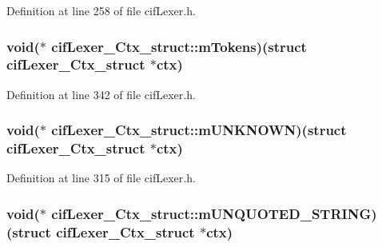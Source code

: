 Definition at line 258 of file cif\-Lexer.\-h.

\hypertarget{structcif_lexer___ctx__struct_a5a963de00b655ae5eaa9d6cc97034ee0}{
\subsubsection[{m\-Tokens}]{\setlength{\rightskip}{0pt plus 5cm}void($\ast$ cif\-Lexer\-\_\-\-Ctx\-\_\-struct\-::m\-Tokens)(struct {\bf cif\-Lexer\-\_\-\-Ctx\-\_\-struct} $\ast$ctx)}}\label{structcif_lexer___ctx__struct_a5a963de00b655ae5eaa9d6cc97034ee0}


Definition at line 342 of file cif\-Lexer.\-h.

\hypertarget{structcif_lexer___ctx__struct_a9b13cfad1301cedf198eee8a8a918ebd}{
\subsubsection[{m\-U\-N\-K\-N\-O\-W\-N}]{\setlength{\rightskip}{0pt plus 5cm}void($\ast$ cif\-Lexer\-\_\-\-Ctx\-\_\-struct\-::m\-U\-N\-K\-N\-O\-W\-N)(struct {\bf cif\-Lexer\-\_\-\-Ctx\-\_\-struct} $\ast$ctx)}}\label{structcif_lexer___ctx__struct_a9b13cfad1301cedf198eee8a8a918ebd}


Definition at line 315 of file cif\-Lexer.\-h.

\hypertarget{structcif_lexer___ctx__struct_a310180509619e27fcc718fd0af2a6256}{
\subsubsection[{m\-U\-N\-Q\-U\-O\-T\-E\-D\-\_\-\-S\-T\-R\-I\-N\-G}]{\setlength{\rightskip}{0pt plus 5cm}void($\ast$ cif\-Lexer\-\_\-\-Ctx\-\_\-struct\-::m\-U\-N\-Q\-U\-O\-T\-E\-D\-\_\-\-S\-T\-R\-I\-N\-G)(struct {\bf cif\-Lexer\-\_\-\-Ctx\-\_\-struct} $\ast$ctx)}}\label{structcif_lexer___ctx__struct_a310180509619e27fcc718fd0af2a6256}


